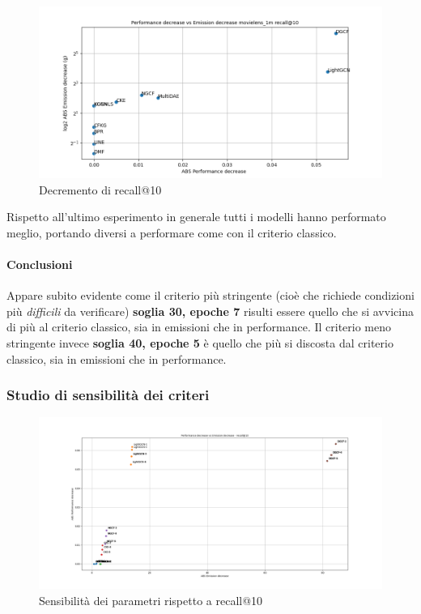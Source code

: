 \begin{figure}[H]
    \centering
     \includegraphics[width=\textwidth]{images/decrement_recall@10_movielens_1m_30_7.png}
    \caption{Decremento di recall@10}
\end{figure}

\noindent Rispetto all'ultimo esperimento in generale tutti i modelli hanno performato meglio, portando diversi a performare come con il criterio classico.

\paragraph{Conclusioni}

Appare subito evidente come il criterio più stringente (cioè che richiede condizioni più \textit{difficili} da verificare) \textbf{soglia 30, epoche 7} risulti essere quello che si avvicina di più al criterio classico, sia in emissioni che in performance. Il criterio meno stringente invece \textbf{soglia 40, epoche 5} è quello che più si discosta dal criterio classico, sia in emissioni che in performance.\\


\subsubsection{Studio di sensibilità dei criteri}

\begin{figure}[H]
    \includegraphics[width=\textwidth]{images/sensibility_recall@10.png}
    \caption{Sensibilità dei parametri rispetto a recall@10}
\end{figure}

